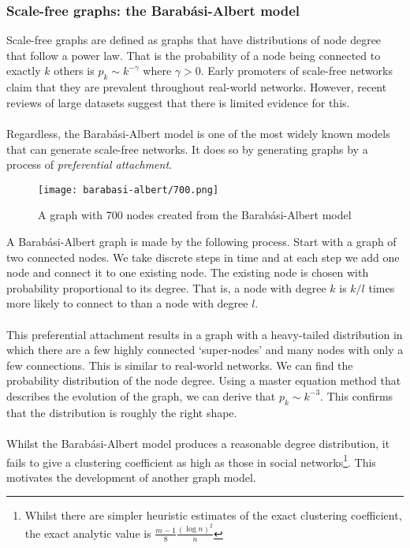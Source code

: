\subsubsection{Scale-free graphs: the Barab\'asi-Albert model}
Scale-free graphs are defined as graphs that have distributions of node degree that follow a power law. That is the probability of a node being connected to exactly $k$ others is $p_k\sim k^{-\gamma}$ where $\gamma>0$. Early promoters of scale-free networks claim that they are prevalent throughout real-world networks\cite{barabasi-albert}. However, recent reviews of large datasets suggest that there is limited evidence for this\cite{scale-free-rare}.\\
\label{mmd}
\\
Regardless, the Barab\'asi-Albert model is one of the most widely known models that can generate scale-free networks. It does so by generating graphs by a process of \textit{preferential attachment}\cite{barabasi-albert}. 
\begin{figure}
	\centering
	\texttt{[image: barabasi-albert/700.png]}
	\caption{A graph with 700 nodes created from the Barab\'asi-Albert model}
	\label{fig:ba-700}
\end{figure}
A Barab\'asi-Albert graph is made by the following process. Start with a graph of two connected nodes. We take discrete steps in time and at each step we add one node and connect it to one existing node. The existing node is chosen with probability proportional to its degree. That is, a node with degree $k$ is $k/l$ times more likely to connect to  than a node with degree $l$\cite{galla}.\\
\\
This preferential attachment results in a graph with a heavy-tailed distribution in which there are a few highly connected `super-nodes' and many nodes with only a few connections. This is similar to real-world networks. We can find the probability distribution of the node degree. Using a master equation method that describes the evolution of the graph, we can derive that $p_k\sim k^{-3}$\cite{galla}. This confirms that the distribution is roughly the right shape. 
\\
\\
Whilst the Barab\'asi-Albert model produces a reasonable degree distribution, it fails to give a clustering coefficient as high as those in social networks\footnote{Whilst there are simpler heuristic estimates of the exact clustering coefficient, the exact analytic value is $\frac{m-1}{8}\frac{(\log n)^2}{n}$\cite{ba-cluster}}. This motivates the development of another graph model.
